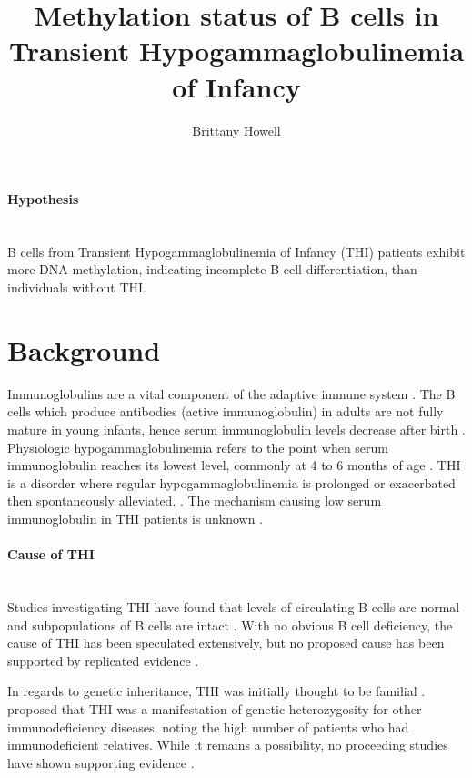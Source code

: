 \documentclass[12pt]{article}
\title{Methylation status of B cells in Transient Hypogammaglobulinemia of Infancy}
\date{}
\author{Brittany Howell}
\begin{document}
	\maketitle
	
	\paragraph{Hypothesis}
	~\\
	B cells from Transient Hypogammaglobulinemia of Infancy (THI) patients exhibit more DNA methylation, indicating incomplete B cell differentiation, than individuals without THI.
	
	\section{Background}
	
		Immunoglobulins are a vital component of the adaptive immune system \citep{Simon15}.  
		The B cells which produce antibodies (active immunoglobulin) in adults are not fully mature in young infants, hence serum immunoglobulin levels decrease after birth \citep{Martin10,Rechavi15,Stiemh80}. 
		Physiologic hypogammaglobulinemia refers to the point when serum immunoglobulin reaches its lowest level, commonly at 4 to 6 months of age \citep{Dressler89}. 
		THI is a disorder where regular hypogammaglobulinemia is prolonged or exacerbated then spontaneously alleviated. \citep{Stiemh80,Dressler89,AlHerz14,Gitlin56,AlHerz11,Rosen66,McGeady87, Dalal98,Tiller78,Buckley83}.
		The mechanism causing low serum immunoglobulin in THI patients is unknown \citep{AlHerz14}. 

			
		\paragraph{Cause of THI} 
			~\\
			Studies investigating THI have found that levels of circulating B cells are normal and subpopulations of B cells are intact \citep{Tiller78,Stiemh80,Siegel81,Buckley83,Fiorilli86,Dressler89}.
			With no obvious B cell deficiency, the cause of THI has been speculated extensively, but no proposed cause has been supported by replicated evidence \citep{Fudenberg64,Rosen66,Nathenson71,Willenbockel60,Soothill68,Tiller78,Fiorilli86,Ovadia14,Siegel81,McGeady87}.
			
			In regards to genetic inheritance, THI was initially thought to be familial \citep{Willenbockel60}. 
			\citet{Soothill68} proposed that THI was a manifestation of genetic heterozygosity for other immunodeficiency diseases, noting the high number of patients who had immunodeficient relatives.
			While it remains a possibility, no proceeding studies have shown supporting evidence \citep{Tiller78,Fiorilli86, Ovadia14}.
			
\end{document}
